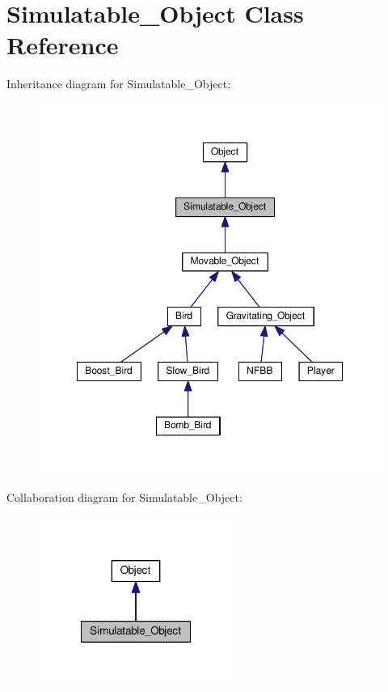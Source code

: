 \hypertarget{classSimulatable__Object}{\section{Simulatable\+\_\+\+Object Class Reference}
\label{classSimulatable__Object}
}


Inheritance diagram for Simulatable\+\_\+\+Object\+:\nopagebreak
\begin{figure}[H]
\begin{center}
\leavevmode
\includegraphics[width=350pt]{classSimulatable__Object__inherit__graph}
\end{center}
\end{figure}


Collaboration diagram for Simulatable\+\_\+\+Object\+:\nopagebreak
\begin{figure}[H]
\begin{center}
\leavevmode
\includegraphics[width=180pt]{classSimulatable__Object__coll__graph}
\end{center}
\end{figure}
